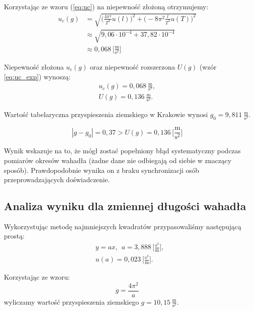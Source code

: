 \documentclass[12pt,a4paper]{article}
\numberwithin{equation}{section}
\begin{document}
Korzystając ze wzoru (\ref{eq:uc}) na niepewność złożoną otrzymujemy:
\begin{equation}
	\begin{split}
	u_c(g) & = \sqrt{\Bigg(\frac{4\pi^2}{T^2}u(l)\Bigg)^2 + \Bigg(-8\pi^2\frac{l}{T^3}u(T)\Bigg)^2} \\
	 	   & \approx \sqrt{9,06 \cdot 10^{-4} + 37,82 \cdot 10^{-4}} \\ & \approx0,068~\Big[\frac{\textrm{m}}{\textrm{s}^2}\Big]
	\end{split}
\end{equation}

Niepewność złożona $u_c(g)$ oraz niepewność rozszerzona $U(g)$ (wzór \ref{eq:uc_exp}) wynoszą:
\begin{align}
	u_c(g) = 0,068~\frac{\textrm{m}}{\textrm{s}^2},\\
	U(g) = 0,136~\frac{\textrm{m}}{\textrm{s}^2}.
\end{align}

Wartość tabelaryczna przyspieszenia ziemskiego w Krakowie wynosi $g_0 = 9,811~\frac{\textrm{m}}{\textrm{s}^2}$.

\begin{equation}
	|g - g_0| = 0,37 > U(g) = 0,136~\Big[\frac{\textrm{m}}{\textrm{s}^2}\Big]
	\label{eq:gconst}
\end{equation}

Wynik wskazuje na to, że mógł zostać popełniony błąd systematyczny podczas pomiarów okresów wahadła (żadne dane nie odbiegają od siebie w znaczący sposób). Prawdopodobnie wynika on z braku synchronizacji osób przeprowadzających doświadczenie.

\pagebreak
\subsection{Analiza wyniku dla zmiennej długości wahadła}


Wykorzystując metodę najmniejszych kwadratów przypasowaliśmy następującą prostą:
\begin{equation}
	\begin{split}
	&y = ax,~~ a = 3,888~\Big[\frac{\textrm{s}^2}{\textrm{m}}\Big],\\ 
	&u(a) = 0,023~\Big[\frac{\textrm{s}^2}{\textrm{m}}\Big].
	\end{split}
\end{equation}

\pagebreak
Korzystając ze wzoru:
\begin{equation}
	g = \frac{4\pi^2}{a}
\end{equation}
wyliczamy wartość przyspieszenia ziemskiego $g = 10,15~\frac{\textrm{m}}{\textrm{s}^2}$.
\end{document}
